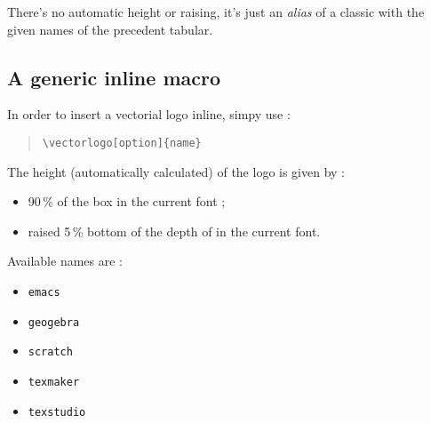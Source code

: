 \documentclass[11pt,a4paper]{ltxdoc}
\begin{document}
There's no automatic height or raising, it's just an \textit{alias} of a classic  with the given names of the precedent tabular.


\begin{tcblisting}{}
\par
{}\par
{}\par
{}\par
{}
\end{tcblisting}

\pagebreak

\subsection{A generic inline macro}

In order to insert a vectorial logo inline, simpy use :

\begin{quote}
\begin{verbatim}
\vectorlogo[option]{name}
\end{verbatim}
\end{quote}

The height (automatically calculated) of the logo is given by :

\begin{itemize}
	\item 90\,\% of the box  in the current font ;
	\item raised 5\,\% bottom of the depth of  in the current font.
\end{itemize}

Available \textsf{names} are :

\begin{multicols}{3}
	\begin{itemize}
		\item \texttt{emacs}
		\item \texttt{geogebra}
		\item \texttt{scratch}
		\item \texttt{texmaker}
		\item \texttt{texstudio}
	\end{itemize}
\end{multicols}
\end{document}
